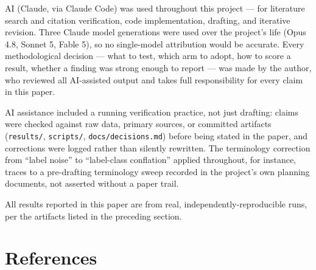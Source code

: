 \documentclass[11pt]{article}
\begin{document}
AI (Claude, via Claude Code) was used throughout this project --- for literature search and
citation verification, code implementation, drafting, and iterative revision. Three Claude
model generations were used over the project's life (Opus 4.8, Sonnet 5, Fable 5), so no
single-model attribution would be accurate. Every methodological decision --- what to test,
which arm to adopt, how to score a result, whether a finding was strong enough to report ---
was made by the author, who reviewed all AI-assisted output and takes full responsibility for
every claim in this paper.

AI assistance included a running verification practice, not just drafting: claims were
checked against raw data, primary sources, or committed artifacts (\texttt{results/},
\texttt{scripts/}, \texttt{docs/decisions.md}) before being stated in the paper, and
corrections were logged rather than silently rewritten. The terminology correction from
``label noise'' to ``label-class conflation'' applied throughout, for instance, traces to a
pre-drafting terminology sweep recorded in the project's own planning documents, not asserted
without a paper trail.

All results reported in this paper are from real, independently-reproducible runs, per the
artifacts listed in the preceding section.

\section{References}\label{references}
\end{document}
